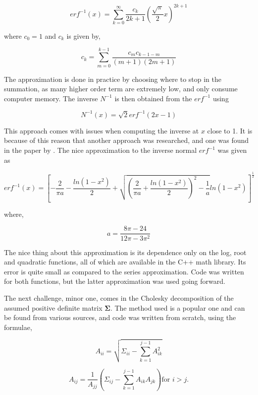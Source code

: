 \documentclass[a4paper,12pt]{article}
\begin{document}
\begin{equation}
erf^{-1}(x) = \sum\limits_{k = 0}^{\infty}\frac{c_k}{2k + 1}\left(\frac{\sqrt{\pi}}{2}x \right)^{2k + 1}
\end{equation}

where $c_0 = 1$ and $c_k$ is given by,

$$c_k = \sum\limits_{m = 0}^{k - 1}\frac{c_m c_{k - 1- m}}{(m + 1)(2m + 1)}$$

The approximation is done in practice by choosing where to stop in the summation, as many higher order term are extremely low, and only consume computer memory. The inverse $N^{-1}$ is then obtained from the $erf^{-1}$ using 

$$N^{-1}(x) = \sqrt{2}erf^{-1}(2x - 1)$$

This approach comes with issues when computing the inverse at $x$ close to 1. It is because of this reason that another approach was researched, and one was found in the paper by \cite{sergei}. The nice approximation to the inverse normal $erf^{-1}$ was given as 

\begin{equation}
erf^{-1}(x) = \left[-\frac{2}{\pi a} - \frac{ln(1 - x^2)}{2} + \sqrt{\left(\frac{2}{\pi a} + \frac{ln(1 - x^2)}{2} \right)^2 - \frac{1}{a}}ln(1 - x^2) \right]^{\frac{1}{2}}
\end{equation}

where,

$$a = \frac{8\pi - 24}{12\pi - 3\pi^2}$$

The nice thing about this approximation is its dependence only on the log, root and quadratic functions, all of which are available in the C++ math library. Its error is quite small as compared to the series approximation. Code was written for both functions, but the latter approximation was used going forward. 

The next challenge, minor one, comes in the Cholesky decomposition of the assumed positive definite matrix $\mathbf{\Sigma}$. The method used is a popular one and can be found from various sources, and code was written from scratch, using the formulae,

\begin{equation}
A_{ii} = \sqrt{\Sigma_{ii} - \sum\limits_{k = 1}^{j - 1}A_{ik}^2}
\end{equation}

\begin{equation}
A_{ij} = \frac{1}{A_{jj}}\left( \Sigma_{ij} - \sum\limits_{k = 1}^{j - 1}A_{ik}A_{jk} \right) \text{for } i > j.
\end{equation}
\end{document}
